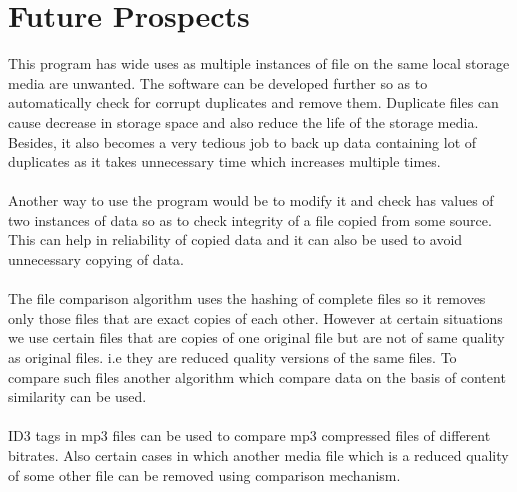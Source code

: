 \chapter{Future Prospects}
This program has wide uses as multiple instances of file on the same local storage media are unwanted. The software can be developed further so as to automatically check for corrupt duplicates and remove them. Duplicate files can cause decrease in storage space and also reduce the life of the storage media.  Besides, it also becomes a very tedious job to back up data containing lot of duplicates as it takes unnecessary time which increases multiple times.
\\~\\
Another way to use the program would be to modify it and check has values of two instances of data so as to check integrity of a file copied from some source. This can help in reliability of copied data and it can also be used to avoid unnecessary copying of data.
\\~\\
The file comparison algorithm uses the hashing of complete files so it removes only those files that are exact copies of each other. However at certain situations we use certain files that are copies of one original file but are not of same quality as original files. i.e they are reduced quality versions of the same files.  To compare such files another algorithm which compare data on the basis of content similarity can be used. \\~\\
ID3 tags in mp3 files can be used to compare mp3 compressed files of different bitrates. Also certain cases in which another media file which is a reduced quality of some other file can be removed using comparison mechanism.
